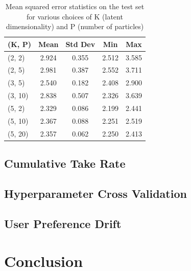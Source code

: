 \documentclass{article}
\begin{document}
\begin{table}[ht]
\caption{Mean squared error statistics on the test set for various choices of K
(latent dimensionality) and P (number of particles)}
\label{sample-table}
\vskip 0.15in
\begin{center}
\begin{small}
\begin{sc}
\begin{tabular}{lcccc}
\toprule
(K, P) & Mean & Std Dev & Min & Max \\
\midrule
(2, 2)  & 2.924 & 0.355 & 2.512 & 3.585 \\
(2, 5)  & 2.981 & 0.387 & 2.552 & 3.711 \\
(3, 5)  & 2.540 & 0.182 & 2.408 & 2.900 \\
(3, 10) & 2.838 & 0.507 & 2.326 & 3.639 \\
(5, 2)  & 2.329 & 0.086 & 2.199 & 2.441 \\
(5, 10) & 2.367 & 0.088 & 2.251 & 2.519 \\
(5, 20) & 2.357 & 0.062 & 2.250 & 2.413 \\
\bottomrule
\end{tabular}
\end{sc}
\end{small}
\end{center}
\vskip -0.1in
\end{table}

\subsection{Cumulative Take Rate}

\subsection{Hyperparameter Cross Validation}

\subsection{User Preference Drift}

\section{Conclusion}

\nocite{kawale2015efficient}
\nocite{wang2017online}
\nocite{zhao2013interactive}
\nocite{cherkassky2013sequential}
\nocite{arulampalam2002tutorial}



\end{document}
